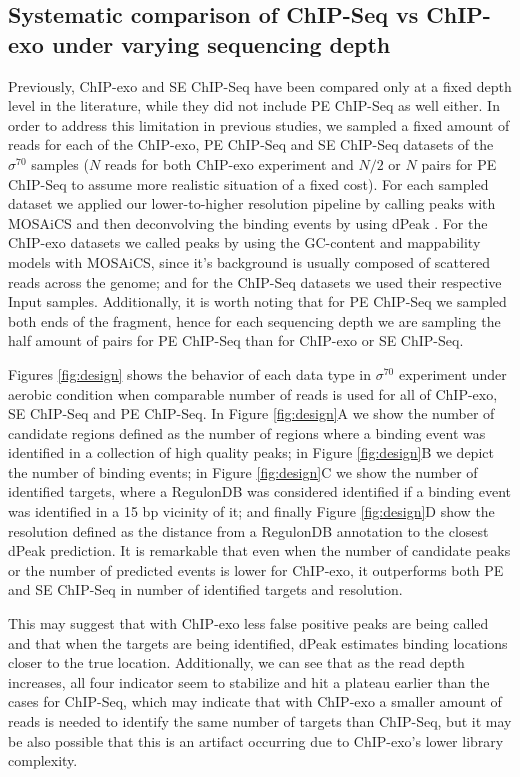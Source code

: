 \documentclass{bmcart}\usepackage[]{graphicx}\usepackage[]{color}
\newcommand{\sig}{\sigma^{70}}
\begin{document}
\subsection{Systematic comparison of ChIP-Seq vs ChIP-exo under
  varying sequencing depth}

Previously, ChIP-exo and SE ChIP-Seq have been compared only at a
fixed depth level in the literature, while they did not include PE
ChIP-Seq as well either. In order to address this limitation in
previous studies, we sampled a fixed amount of reads for each of the
ChIP-exo, PE ChIP-Seq and SE ChIP-Seq datasets of the $\sig$ samples
($N$ reads for both ChIP-exo experiment and $N/2$ or $N$ pairs for PE
ChIP-Seq to assume more realistic situation of a fixed cost). For each
sampled dataset we applied our lower-to-higher resolution pipeline by
calling peaks with MOSAiCS \cite{mosaics} and then deconvolving the
binding events by using dPeak \cite{dpeak}. For the ChIP-exo datasets
we called peaks by using the GC-content and mappability models with
MOSAiCS, since it's background is usually composed of scattered reads
across the genome; and for the ChIP-Seq datasets we used their
respective Input samples. Additionally, it is worth noting that for PE
ChIP-Seq we sampled both ends of the fragment, hence for each
sequencing depth we are sampling the half amount of pairs for PE
ChIP-Seq than for ChIP-exo or SE ChIP-Seq.

Figures \ref{fig:design} shows the behavior of each data type in
$\sig$ experiment under aerobic condition when comparable number of
reads is used for all of ChIP-exo, SE ChIP-Seq and PE ChIP-Seq. In
Figure \ref{fig:design}A we show the number of candidate regions
defined as the number of regions where a binding event was identified
in a collection of high quality peaks; in Figure \ref{fig:design}B we
depict the number of binding events; in Figure \ref{fig:design}C we
show the number of identified targets, where a RegulonDB was
considered identified if a binding event was identified in a 15 bp
vicinity of it; and finally Figure \ref{fig:design}D show the
resolution defined as the distance from a RegulonDB annotation to the
closest dPeak prediction. It is remarkable that even when the number
of candidate peaks or the number of predicted events is lower for
ChIP-exo, it outperforms both PE and SE ChIP-Seq in number of
identified targets and resolution.

This may suggest that with ChIP-exo less false positive peaks are
being called and that when the targets are being identified, dPeak
estimates binding locations closer to the true location. Additionally,
we can see that as the read depth increases, all four indicator seem
to stabilize and hit a plateau earlier than the cases for ChIP-Seq,
which may indicate that with ChIP-exo a smaller amount of reads is
needed to identify the same number of targets than ChIP-Seq, but it
may be also possible that this is an artifact occurring due to
ChIP-exo's lower library complexity. 
\end{document}
